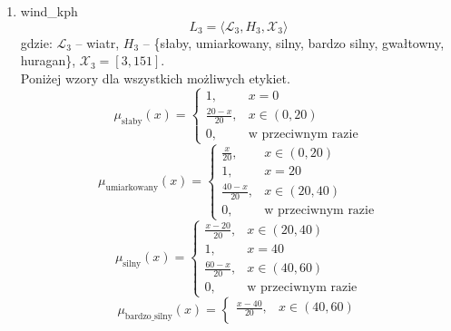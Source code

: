 \documentclass{article}
\begin{document}
\begin{enumerate}
    \item wind\_kph
        \begin{equation}
            L_3 = \langle \mathcal{L}_3, H_3, \mathcal{X}_3 \rangle
        \end{equation}
        gdzie: $\mathcal{L}_3$ – wiatr, $H_3$ – \{słaby, umiarkowany, silny, bardzo silny, gwałtowny, huragan\}, $\mathcal{X}_3 = [3, 151]$. \\
        Poniżej wzory dla wszystkich możliwych etykiet.
                  \begin{equation}
                    \mu_{\text{słaby}}(x) =
                    \begin{cases}
                    1, & x = 0 \\
                    \frac{20 - x}{20}, & x \in (0, 20) \\
                    0, & \text{w przeciwnym razie}
                    \end{cases}
                  \end{equation}
                \begin{equation}
                    \mu_{\text{umiarkowany}}(x) =
                    \begin{cases}
                    \frac{x}{20}, & x \in (0, 20) \\
                    1, & x = 20 \\
                    \frac{40 - x}{20}, & x \in (20, 40) \\
                    0, & \text{w przeciwnym razie}
                    \end{cases}
                  \end{equation}
                \begin{equation}
                    \mu_{\text{silny}}(x) =
                    \begin{cases}
                    \frac{x - 20}{20}, & x \in (20, 40) \\
                    1, & x = 40 \\
                    \frac{60 - x}{20}, & x \in (40, 60) \\
                    0, & \text{w przeciwnym razie}
                    \end{cases}
              \end{equation}
                \begin{equation}
                    \mu_{\text{bardzo\_silny}}(x) =
                    \begin{cases}
                    \frac{x - 40}{20}, & x \in (40, 60) \\

\end{cases}
\end{equation}
\end{enumerate}
\end{document}
